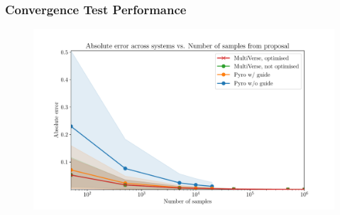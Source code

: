 \documentclass[usenames,dvipsnames]{beamer}
\begin{document}
\begin{frame}
  \frametitle{Convergence Test Performance}
  \begin{figure}[ht]
    \centering
    \includegraphics[width=1.0\textwidth,keepaspectratio]{figures/convergence.pdf}
    \caption*{\label{fig:convergence}}
  \end{figure}
\end{frame}
\end{document}
